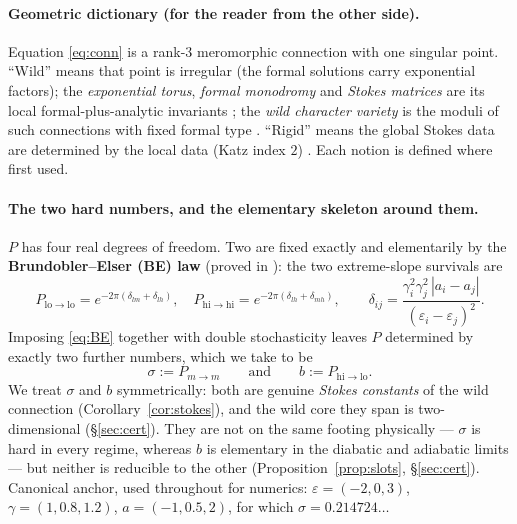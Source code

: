 \documentclass[11pt]{article}
\theoremstyle{definition}
\theoremstyle{remark}
\newcommand{\eps}{\varepsilon}
\newcommand{\Pmid}{P_{m\to m}}
\newcommand{\lo}{\mathrm{lo}}
\newcommand{\hi}{\mathrm{hi}}
\begin{document}
\paragraph{Geometric dictionary (for the reader from the other side).} Equation
\eqref{eq:conn} is a rank-$3$ meromorphic connection with one singular point. ``Wild''
means that point is irregular (the formal solutions carry exponential factors); the
\emph{exponential torus}, \emph{formal monodromy} and \emph{Stokes matrices} are its local
formal-plus-analytic invariants \cite{Wasow1965,LR2016,vdPS2003}; the \emph{wild character
variety} is the moduli of such connections with fixed formal type \cite{Boalch2014}.
``Rigid'' means the global Stokes data are determined by the local data
(Katz index $2$) \cite{Katz1996}. Each notion is defined where first used.

\paragraph{The two hard numbers, and the elementary skeleton around them.} $P$ has four real
degrees of freedom. Two are fixed exactly and elementarily by the \textbf{Brundobler--Elser
(BE) law} \cite{BE1993} (proved in \cite{VO2004,DS2006}): the two extreme-slope survivals
are
\begin{equation}\label{eq:BE}
P_{\lo\to\lo}=e^{-2\pi(\delta_{lm}+\delta_{lh})},\quad
P_{\hi\to\hi}=e^{-2\pi(\delta_{lh}+\delta_{mh})},\qquad
\delta_{ij}=\frac{\gamma_i^2\gamma_j^2\,|a_i-a_j|}{(\eps_i-\eps_j)^2}.
\end{equation}
Imposing \eqref{eq:BE} together with double stochasticity leaves $P$ determined by exactly
two further numbers, which we take to be
\begin{equation}\label{eq:sigmab}
\sigma:=\Pmid \qquad\text{and}\qquad b:=P_{\hi\to\lo}.
\end{equation}
We treat $\sigma$ and $b$ symmetrically: both are genuine \emph{Stokes constants} of the
wild connection (Corollary~\ref{cor:stokes}), and the wild core they span is two-dimensional
(\S\ref{sec:cert}). They are not on the same footing physically --- $\sigma$ is hard in
every regime, whereas $b$ is elementary in the diabatic and adiabatic limits --- but neither
is reducible to the other (Proposition~\ref{prop:slots}, \S\ref{sec:cert}). Canonical anchor,
used throughout for numerics: $\eps=(-2,0,3)$, $\gamma=(1,0.8,1.2)$, $a=(-1,0.5,2)$, for
which $\sigma=0.214724\ldots$
\end{document}
